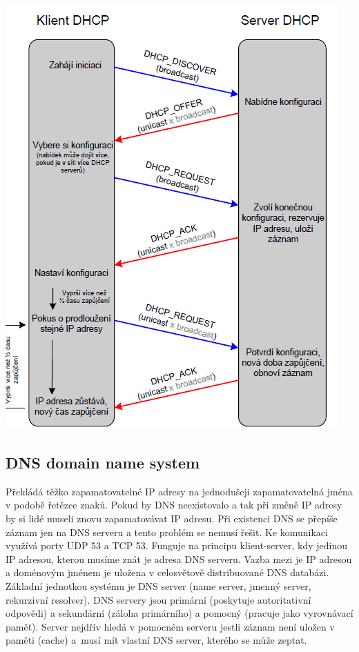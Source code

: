 \begin{center}
\includegraphics[scale = 0.8]{images/dhcp.png}
\end{center}

\subsection{DNS domain name system}

Překládá těžko zapamatovatelné IP adresy na jednodušeji zapamatovatelná jména v podobě řetězce znaků. Pokud by DNS neexistovalo a tak při změně IP adresy by si lidé museli znovu zapamatovávat IP adresu. Při existenci DNS se přepíše záznam jen na DNS serveru a tento problém se nemusí řešit. Ke komunikaci využívá porty UDP 53 a TCP 53. Funguje na principu klient-server, kdy jedinou IP adresou, kterou musíme znát je adresa DNS serveru. Vazba mezi je IP adresou a doménovým jménem je uložena v celosvětově distribuované DNS databázi. Základní jednotkou systému je DNS server (name server, jmenný server, rekurzivní resolver). DNS servery jsou primární (poskytuje autoritativní odpovědi) a sekundární (záloha primárního) a pomocný (pracuje jako vyrovnávací paměť). Server nejdřív hledá v pomocném serveru jestli záznam není uložen v paměti (cache) a~musí mít vlastní DNS server, kterého se může zeptat.

